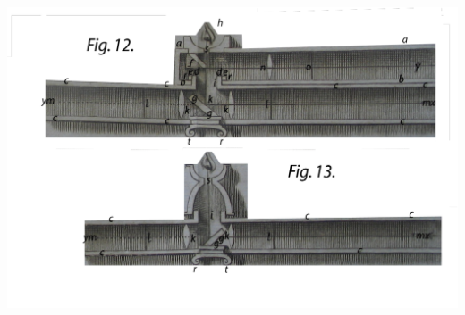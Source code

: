 \pend
\vspace{1.2em}
\count{}
\count{}
\count{}
\begin{center}                    
\includegraphics[trim = 0mm 0mm 0mm 1mm, clip, width=1\textwidth, angle=-0.5]{images/LH0351506_013r-dext13.pdf}\newline
{}
\end{center}
